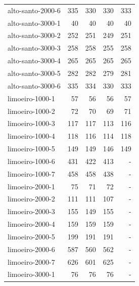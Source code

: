 \begin{table}[ht!]
{\begin{tabular}{lrrrr}
			alto-santo-2000-6                                  & 335 & 330 & 330 & 333 \\
			alto-santo-3000-1                                  & 40  & 40  & 40  & 40  \\
			alto-santo-3000-2                                  & 252 & 251 & 249 & 251 \\
			alto-santo-3000-3                                  & 258 & 258 & 255 & 258 \\
			alto-santo-3000-4                                  & 265 & 265 & 265 & 265 \\
			alto-santo-3000-5                                  & 282 & 282 & 279 & 281 \\
			alto-santo-3000-6                                  & 335 & 334 & 330 & 333 \\
			\midrule
			limoeiro-1000-1                                    & 57  & 56  & 56  & 57  \\
			limoeiro-1000-2                                    & 72  & 70  & 69  & 71  \\
			limoeiro-1000-3                                    & 117 & 117 & 113 & 116 \\
			limoeiro-1000-4                                    & 118 & 116 & 114 & 118 \\
			limoeiro-1000-5                                    & 149 & 149 & 146 & 149 \\
			limoeiro-1000-6                                    & 431 & 422 & 413 & -   \\
			limoeiro-1000-7                                    & 458 & 458 & 438 & -   \\
			limoeiro-2000-1                                    & 75  & 71  & 72  & -   \\
			limoeiro-2000-2                                    & 111 & 111 & 107 & -   \\
			limoeiro-2000-3                                    & 155 & 149 & 155 & -   \\
			limoeiro-2000-4                                    & 159 & 159 & 159 & -   \\
			limoeiro-2000-5                                    & 199 & 191 & 191 & -   \\
			limoeiro-2000-6                                    & 587 & 560 & 562 & -   \\
			limoeiro-2000-7                                    & 626 & 601 & 625 & -   \\
			limoeiro-3000-1                                    & 76  & 76  & 76  & -   \\

\end{tabular}}
\end{table}
